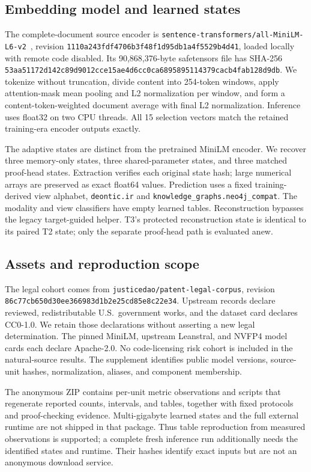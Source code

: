 \subsection{Embedding model and learned states}
\label{app:llm-minilm}
The complete-document source encoder is
\texttt{sentence-transformers/all-MiniLM-L6-v2}~\citep{sentence_transformers2026minilm}, revision
\texttt{1110a243fdf4706b3f48f1d95db1a4f5529b4d41}, loaded locally with
remote code disabled. Its 90,868,376-byte safetensors file has SHA-256
\texttt{53aa51172d142c89d9012cce15ae4d6cc0ca6895895114379cacb4fab128d9db}.
We tokenize without truncation, divide content into 254-token windows,
apply attention-mask mean pooling and L2 normalization per window, and
form a content-token-weighted document average with final L2 normalization.
Inference uses float32 on two CPU threads. All 15 selection vectors match
the retained training-era encoder outputs exactly.

The adaptive states are distinct from the pretrained MiniLM encoder. We
recover three memory-only states, three shared-parameter states, and three
matched proof-head states. Extraction verifies each original state hash;
large numerical arrays are preserved as exact float64 values. Prediction
uses a fixed training-derived view alphabet, \texttt{deontic.ir} and
\texttt{knowledge\_graphs.neo4j\_compat}. The modality and view classifiers
have empty learned tables. Reconstruction bypasses the legacy
target-guided helper. T3's protected reconstruction state is identical to
its paired T2 state; only the separate proof-head path is evaluated anew.

\subsection{Assets and reproduction scope}
\label{app:assets}
The legal cohort comes from \texttt{justicedao/patent-legal-corpus},
revision \texttt{86c77cb650d30ee366983d1b2e25cd85e8c22e34}. Upstream records
declare reviewed, redistributable U.S.\ government works, and the dataset
card declares CC0-1.0. We retain those declarations without asserting a
new legal determination. The pinned MiniLM, upstream Leanstral, and NVFP4
model cards each declare Apache-2.0. No code-licensing risk cohort is included in the
natural-source results. The supplement identifies public model versions,
source-unit hashes, normalization, aliases, and component membership.

The anonymous ZIP contains per-unit metric observations and scripts that
regenerate reported counts, intervals, and tables, together with fixed
protocols and proof-checking evidence. Multi-gigabyte learned states and
the full external runtime are not shipped in that package. Thus table
reproduction from measured observations is supported; a complete fresh
inference run additionally needs the identified states and runtime. Their
hashes identify exact inputs but are not an anonymous download service.

